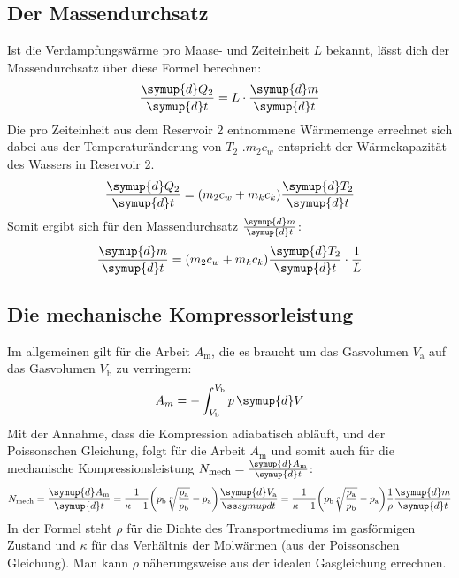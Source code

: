 \subsection{Der Massendurchsatz}
Ist die Verdampfungswärme pro Maase- und Zeiteinheit $L$ bekannt, lässt dich der Massendurchsatz über diese Formel berechnen:
\begin{equation}
    \frac{\symup{d}Q_2}{\symup{d}t} = L \cdot \frac{\symup{d}m}{\symup{d}t}
\end{equation}
Die pro Zeiteinheit aus dem Reservoir 2 entnommene Wärmemenge errechnet sich dabei aus der Temperaturänderung von $T_2$ .$m_2c_w$ entspricht der Wärmekapazität des Wassers in Reservoir 2.
\begin{equation}
    \frac{\symup{d}Q_2}{\symup{d}t} = (m_2c_w + m_kc_k) \frac{\symup{d}T_2}{\symup{d}t}
\end{equation}
Somit ergibt sich für den Massendurchsatz $\frac{\symup{d}m}{\symup{d}t}$:
\begin{equation}\label{eqn:massendurchsatz}
    \frac{\symup{d}m}{\symup{d}t} = (m_2c_w + m_kc_k) \frac{\symup{d}T_2}{\symup{d}t} \cdot \frac{1}{L}
\end{equation}

\subsection{Die mechanische Kompressorleistung}
Im allgemeinen gilt für die Arbeit $A_{\text{m}}$, die es braucht um das Gasvolumen $V_{\text{a}}$ auf das Gasvolumen $V_{\text{b}}$ zu verringern: 
\begin{equation*}
    A_m = - \int_{V_{\text{b}}}^{V_{\text{b}}} p\, \symup{d}V
\end{equation*}
Mit der Annahme, dass die Kompression adiabatisch abläuft, und der Poissonschen Gleichung, folgt für die Arbeit $A_{\text{m}}$ und somit auch für die mechanische Kompressionsleistung $N_{\text{mech}} = \frac{\symup{d}A_{\text{m}}}{\symup{d}t}$:
\begin{equation} \label{eqn:kompressorleistung}
    N_{\text{mech}} = \frac{\symup{d}A_{\text{m}}}{\symup{d}t} 
    = \frac{1}{\kappa - 1} \biggl( p_{\text{b}} \sqrt[\kappa]{\frac{p_{\text{a}}}{p_{\text{b}}}} - p_{\text{a}} \biggr) \frac{\symup{d}V_{\text{a}}}{ßsymup{d}t}
    = \frac{1}{\kappa -1} \biggl( p_{\text{b}} \sqrt[\kappa]{\frac{p_{\text{a}}}{p_{\text{b}}}} - p_{\text{a}} \biggr) \frac{1}{\rho} \frac{\symup{d}m}{\symup{d}t}
\end{equation}
In der Formel steht $\rho$ für die Dichte des Transportmediums im gasförmigen Zustand und $\kappa$ für das Verhältnis der Molwärmen (aus der Poissonschen Gleichung).
Man kann $\rho$ näherungsweise aus der idealen Gasgleichung errechnen.
